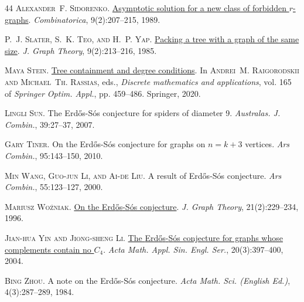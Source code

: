\documentclass[a4paper,11pt]{article}
\begin{document}
\begin{thebibliography}{44}
\textsc{Alexander~F. Sidorenko}.
\newblock \href{https://doi.org/10.1007/BF02124681}{Asymptotic solution for a
  new class of forbidden {$r$}-graphs}.
\newblock \emph{Combinatorica}, 9(2):207--215, 1989.

\textsc{P.~J. Slater, S.~K. Teo, and H.~P. Yap}.
\newblock \href{https://doi.org/10.1002/jgt.3190090203}{Packing a tree with a
  graph of the same size}.
\newblock \emph{J. Graph Theory}, 9(2):213--216, 1985.

\textsc{Maya Stein}.
\newblock \href{https://doi.org/10.1007/978-3-030-55857-4_19}{Tree containment
  and degree conditions}.
\newblock In \textsc{Andrei~M. Raigorodskii and Michael~Th. Rassias}, eds.,
  \emph{Discrete mathematics and applications}, vol. 165 of \emph{Springer
  Optim. Appl.}, pp. 459--486. Springer, 2020.

\textsc{Lingli Sun}.
\newblock The {Erd{\H{o}}s}-{S}\'os conjecture for spiders of diameter 9.
\newblock \emph{Australas. J. Combin.}, 39:27--37, 2007.

\textsc{Gary Tiner}.
\newblock On the {Erd{\H{o}}s}-{S}\'os conjecture for graphs on {$n=k+3$}
  vertices.
\newblock \emph{Ars Combin.}, 95:143--150, 2010.

\textsc{Min Wang, Guo-jun Li, and Ai-de Liu}.
\newblock A result of {Erd{\H{o}}s}-{S}\'os conjecture.
\newblock \emph{Ars Combin.}, 55:123--127, 2000.

\textsc{Mariusz Wo{\'z}niak}.
\newblock
  \href{https://doi.org/10.1002/(SICI)1097-0118(199602)21:2<229::AID-JGT13>3.3.CO;2-2}{On
  the {Erd{\H{o}}s}-{S}\'os conjecture}.
\newblock \emph{J. Graph Theory}, 21(2):229--234, 1996.

\textsc{Jian-hua Yin and Jiong-sheng Li}.
\newblock \href{https://doi.org/10.1007/s10255-004-0178-7}{The
  {Erd{\H{o}}s}-{S}\'os conjecture for graphs whose complements contain no
  {$C_4$}}.
\newblock \emph{Acta Math. Appl. Sin. Engl. Ser.}, 20(3):397--400, 2004.

\textsc{Bing Zhou}.
\newblock A note on the {Erd{\H{o}}s}-{S}\'os conjecture.
\newblock \emph{Acta Math. Sci. (English Ed.)}, 4(3):287--289, 1984.

\end{thebibliography}
\end{document}
